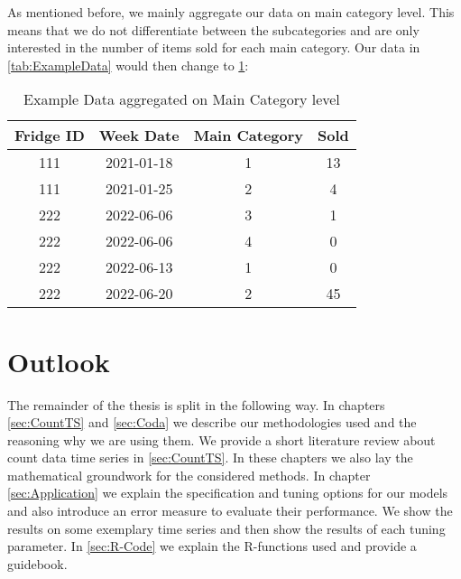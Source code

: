 As mentioned before, we mainly aggregate our data on main category level. This means that we do not differentiate between the subcategories and are only interested in the number of items sold for each main category. Our data in \ref{tab:ExampleData} would then change to \ref{tab:ExampleData aggregated}:

\begin{table}[h!]
\centering
\begin{tabular}{cccc}
\hline
\rowcolor[HTML]{FFFFFF} 
\textbf{Fridge ID} & \textbf{Week Date} & \textbf{Main Category} & \textbf{Sold} \\ \hline
111                & 2021-01-18         & 1                      & 13             \\
111                & 2021-01-25         & 2                      & 4             \\
222                & 2022-06-06         & 3                      & 1             \\
222                & 2022-06-06         & 4                      & 0             \\
222                & 2022-06-13         & 1                      & 0             \\
222                & 2022-06-20         & 2                      & 45            \\ \hline
\end{tabular}
\caption{Example Data aggregated on Main Category level}
\label{tab:ExampleData aggregated}
\end{table}

\section{Outlook}
\label{sec: Outlook}

The remainder of the thesis is split in the following way. In chapters \ref{sec:CountTS} and \ref{sec:Coda} we describe our methodologies used and the reasoning why we are using them. We provide a short literature review about count data time series in \ref{sec:CountTS}. In these chapters we also lay the mathematical groundwork for the considered methods. In chapter \ref{sec:Application} we explain the specification and tuning options for our models and also introduce an error measure to evaluate their performance. We show the results on some exemplary time series and then show the results of each tuning parameter. In \ref{sec:R-Code} we explain the R-functions used and provide a guidebook.%